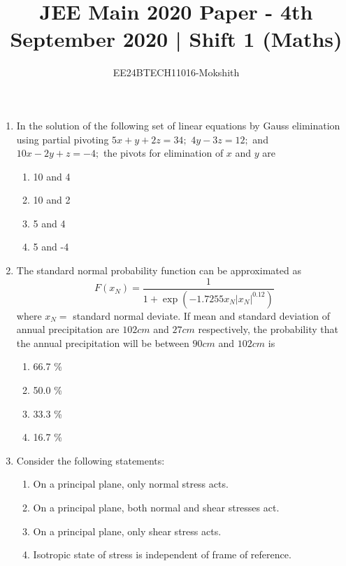 \documentclass[journal]{IEEEtran}
\begin{document}

\title{JEE Main 2020 Paper - 4th September 2020 | Shift 1 (Maths)}
\author{EE24BTECH11016-Mokshith}
{\let\newpage\relax\maketitle}
\renewcommand{\thefigure}{\theenumi}
\renewcommand{\thetable}{\theenumi}
\setlength{\intextsep}{10pt} %
\renewcommand{\thetable}{\theenumi
}
\begin{enumerate}[start=25]
\item In the solution of the following set of linear equations by Gauss elimination using partial pivoting
    $5x + y + 2z = 34;$ \quad $4y - 3z = 12;$ \quad and \quad $10x - 2y + z = -4;$
    the pivots for elimination of $x$ and $y$ are
\begin{enumerate}
    \item 10 and 4
    \item 10 and 2
    \item 5 and 4
    \item 5 and -4
\end{enumerate}
\item The standard normal probability function can be approximated as
$$F(x_N) = \frac{1}{1 + \exp(-1.7255 x_N |x_N|^{0.12})}$$
where $x_N =$ standard normal deviate. If mean and standard deviation of annual precipitation are $102 cm$ and $27 cm$ respectively, the probability that the annual precipitation will be between $90 cm$ and $102 cm$ is
\begin{enumerate}
    \item 66.7 \%
    \item 50.0 \%
    \item 33.3 \%
    \item 16.7 \%
\end{enumerate}
\item Consider the following statements:
\begin{enumerate}[label=\Roman{*}.]
    \item On a principal plane, only normal stress acts.
    \item On a principal plane, both normal and shear stresses act.
    \item On a principal plane, only shear stress acts.
    \item Isotropic state of stress is independent of frame of reference.
\end{enumerate}

\end{enumerate}
\end{document}
